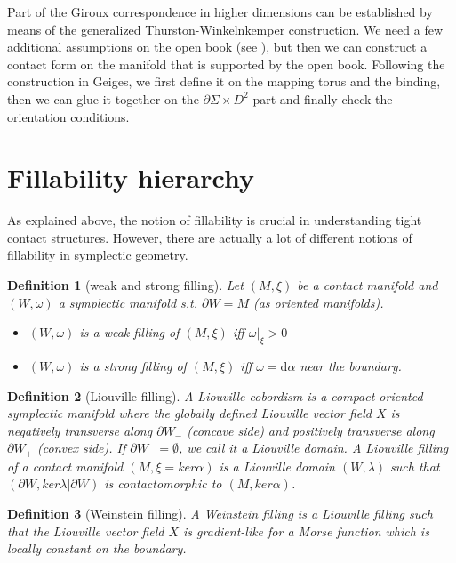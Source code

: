 \documentclass[a4paper]{amsart}
\newtheorem{definition}{Definition}
\renewcommand*{\d}{\mathrm{d}}
\begin{document}
Part of the Giroux correspondence in higher dimensions can be established by means 
of the generalized Thurston-Winkelnkemper construction.
We need a few additional assumptions on the open book (see \cite[Theorem 7.3.3]{Geiges08}), but then we can construct a contact form on the manifold that is supported by the open book.
Following the construction in Geiges, we first define it on the mapping torus and the binding, then we can glue it together on the $\partial \Sigma \times D^2$-part and finally check
the orientation conditions.

\section*{Fillability hierarchy}
As explained above, the notion of fillability is crucial in understanding tight contact structures. However, there are actually a lot of different notions of fillability in symplectic geometry.

\begin{definition}[weak and strong filling]
    Let $(M, \xi)$ be a contact manifold and $(W, \omega)$ a symplectic manifold s.t. $\partial W = M$ (as oriented manifolds).
    \begin{itemize}
        \item $(W, \omega)$ is a weak filling of $(M, \xi)$ iff $\omega|_\xi > 0$
        \item $(W, \omega)$ is a strong filling of $(M, \xi)$ iff $\omega = \d \alpha$ near the boundary.
    \end{itemize}
\end{definition}


\begin{definition}[Liouville filling]
    A Liouville cobordism is a compact oriented symplectic manifold where the globally defined Liouville vector field $X$ is negatively transverse  along $\partial W_-$ (concave side) and positively transverse along $\partial W_+$ (convex side).
    If $\partial W_- = \emptyset$, we call it a Liouville domain.
    A Liouville filling of a contact manifold $(M, \xi = ker \alpha)$ is a Liouville domain $(W, \lambda)$ such that $(\partial W, ker \lambda|\partial W)$ is contactomorphic to $(M, ker \alpha)$.
\end{definition}

\begin{definition}[Weinstein filling]
    A Weinstein filling is a Liouville filling such that the Liouville vector field $X$ is gradient-like for a Morse function which is locally constant on the boundary.
\end{definition}
\end{document}
